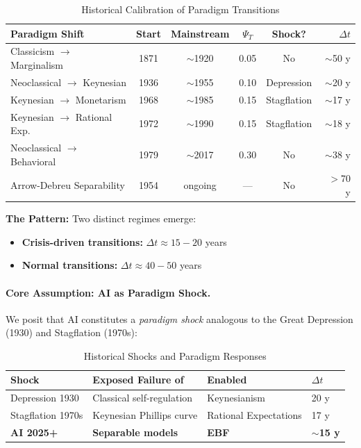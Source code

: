 \begin{table}[htbp]
\centering
\caption{Historical Calibration of Paradigm Transitions}
\label{tab:paradigm-calibration}
\renewcommand{\arraystretch}{1.3}
\small
\begin{tabular}{@{}lccccr@{}}
\toprule
\textbf{Paradigm Shift} & \textbf{Start} & \textbf{Mainstream} & $\Psi_T$ & \textbf{Shock?} & $\Delta t$ \\
\midrule
Classicism $\to$ Marginalism & 1871 & $\sim$1920 & 0.05 & No & $\sim$50 y \\
Neoclassical $\to$ Keynesian & 1936 & $\sim$1955 & 0.10 & Depression & $\sim$20 y \\
Keynesian $\to$ Monetarism & 1968 & $\sim$1985 & 0.15 & Stagflation & $\sim$17 y \\
Keynesian $\to$ Rational Exp. & 1972 & $\sim$1990 & 0.15 & Stagflation & $\sim$18 y \\
Neoclassical $\to$ Behavioral & 1979 & $\sim$2017 & 0.30 & No & $\sim$38 y \\
Arrow-Debreu Separability & 1954 & ongoing & --- & No & $>$70 y \\
\bottomrule
\end{tabular}
\end{table}

\textbf{The Pattern:} Two distinct regimes emerge:
\begin{itemize}[nosep]
    \item \textbf{Crisis-driven transitions:} $\Delta t \approx 15-20$ years
    \item \textbf{Normal transitions:} $\Delta t \approx 40-50$ years
\end{itemize}

\paragraph{Core Assumption: AI as Paradigm Shock.}

We posit that AI constitutes a \textit{paradigm shock} analogous to the Great Depression
(1930) and Stagflation (1970s):

\begin{table}[htbp]
\centering
\caption{Historical Shocks and Paradigm Responses}
\label{tab:shock-response}
\renewcommand{\arraystretch}{1.3}
\small
\begin{tabular}{@{}llll@{}}
\toprule
\textbf{Shock} & \textbf{Exposed Failure of} & \textbf{Enabled} & $\Delta t$ \\
\midrule
Depression 1930 & Classical self-regulation & Keynesianism & 20 y \\
Stagflation 1970s & Keynesian Phillips curve & Rational Expectations & 17 y \\
\textbf{AI 2025+} & \textbf{Separable models} & \textbf{EBF} & \textbf{$\sim$15 y} \\
\bottomrule
\end{tabular}
\end{table}


